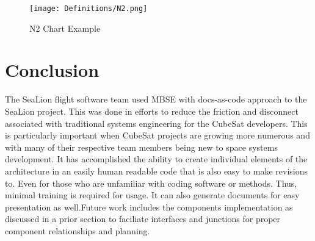 \documentclass[journal,article,submit,pdftex,moreauthors]{Definitions/mdpi}
\begin{document}
\begin{figure}[H]
    \texttt{[image: Definitions/N2.png]}
    \caption{N2 Chart Example}
	\label{fig:N2}
    \end{figure}   
\unskip

\section{Conclusion}
The SeaLion flight software team used MBSE with docs-as-code approach to the SeaLion project. This was done in efforts to reduce the friction and disconnect associated with traditional systems engineering for the CubeSat developers.  This is particularly important when CubeSat projects are growing more numerous and with many of their respective team members being new to space systems development.   It has accomplished the ability to create individual elements of the architecture in an easily human readable code that is also easy to make revisions to.  Even for those who are unfamiliar with coding software or methods.  Thus, minimal training is required for usage.  It can also generate documents for easy presentation as well.Future work includes the components implementation as discussed in a prior section to faciliate interfaces and junctions for proper component relationships and planning.

\vspace{6pt} 


\end{document}
